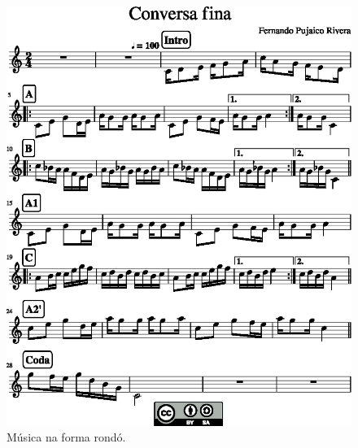 \newpage
     \begin{figure}[!ht]
	     \centering
	     \includegraphics[width=1.0\textwidth]{chapters/cap-musica-topicos/section-choro-1.eps}
	     \caption{Música na forma rondó.}
	     \label{fig:section-choro}
     \end{figure}

\newpage


